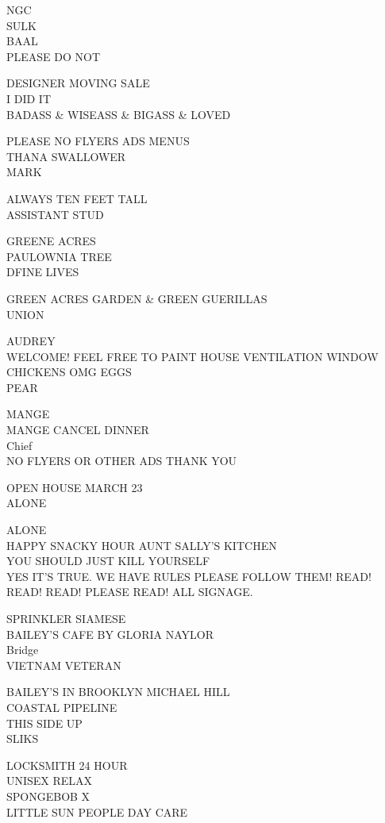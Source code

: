 \documentclass[10pt,letterpaper]{article}
\begin{document}
NGC\\
SULK\\
BAAL\\
PLEASE DO NOT

DESIGNER MOVING SALE\\
I DID IT\\
BADASS \& WISEASS \& BIGASS \& LOVED

PLEASE NO FLYERS ADS MENUS\\
THANA SWALLOWER\\
MARK

ALWAYS TEN FEET TALL\\
ASSISTANT STUD

GREENE ACRES\\
PAULOWNIA TREE\\
DFINE LIVES

GREEN ACRES GARDEN \& GREEN GUERILLAS\\
UNION

AUDREY\\
WELCOME!  FEEL FREE TO PAINT HOUSE  VENTILATION WINDOW\\
CHICKENS OMG EGGS\\
PEAR

MANGE\\
MANGE CANCEL DINNER\\
Chief\\
NO FLYERS OR OTHER ADS THANK YOU

OPEN HOUSE MARCH 23\\
ALONE

ALONE\\
HAPPY SNACKY HOUR AUNT SALLY'S KITCHEN\\
YOU SHOULD JUST KILL YOURSELF\\
YES IT'S TRUE.  WE HAVE RULES PLEASE FOLLOW THEM!  READ! READ! READ! PLEASE READ! ALL SIGNAGE.

SPRINKLER SIAMESE\\
BAILEY'S CAFE BY GLORIA NAYLOR\\
Bridge\\
VIETNAM VETERAN

BAILEY'S IN BROOKLYN MICHAEL HILL\\
COASTAL PIPELINE\\
THIS SIDE UP\\
SLIKS

LOCKSMITH 24 HOUR\\
UNISEX RELAX\\
SPONGEBOB X\\
LITTLE SUN PEOPLE DAY CARE
\end{document}
